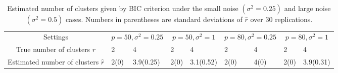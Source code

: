 \documentclass[lettersize,onecolumn,journal]{IEEEtran}
\theoremstyle{definition}
\theoremstyle{definition}
\begin{document}
{
\color{blue} 


    


\begin{table}[hbt]
\color{blue}
    \centering
    
    \begin{tabularx}{\textwidth}{c *{8}{Y}}
    \toprule
    Settings &  &  &  & \\
    \cmidrule(lr){2-3} \cmidrule(l){4-5} \cmidrule(l){6-7} \cmidrule(l){8-9}
         True number of clusters $r$ & 2 & 4 & 2  & 4 & 2  & 4 & 2 & 4  \\
         \midrule
         Estimated number of clusters $\hat r$ &  2(0)  & 3.9(0.25)& 2(0)    & 3.1(0.52) & 2(0)    & 4(0)   & 2(0)    & 3.9(0.31)   \\
     \bottomrule
    \end{tabularx}
    \caption{Estimated number of clusters given by BIC criterion under the small noise $(\sigma^2 = 0.25)$ and large noise $(\sigma^2 = 0.5)$ cases. Numbers in parentheses are standard deviations of $\hat r$ over 30 replications.}
    \label{tab:select}
\end{table}

}
\end{document}
